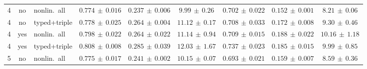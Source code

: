 \begin{table}[H]
{\begin{tabular}{ccl ccc ccc}
    \midrule
    4 & no  & nonlin.\ all     & $0.774{\scriptstyle\,\pm\,0.016}$ & $0.237{\scriptstyle\,\pm\,0.006}$ & $9.99{\scriptstyle\,\pm\,0.26}$ & $0.702{\scriptstyle\,\pm\,0.022}$ & $0.152{\scriptstyle\,\pm\,0.001}$ & $8.21{\scriptstyle\,\pm\,0.06}$ \\
    4 & no  & typed+triple     & $0.778{\scriptstyle\,\pm\,0.025}$ & $0.264{\scriptstyle\,\pm\,0.004}$ & $11.12{\scriptstyle\,\pm\,0.17}$ & $0.708{\scriptstyle\,\pm\,0.033}$ & $0.172{\scriptstyle\,\pm\,0.008}$ & $9.30{\scriptstyle\,\pm\,0.46}$ \\
    \addlinespace[2pt]
    4 & yes & nonlin.\ all     & $0.798{\scriptstyle\,\pm\,0.022}$ & $0.264{\scriptstyle\,\pm\,0.022}$ & $11.14{\scriptstyle\,\pm\,0.94}$ & $0.709{\scriptstyle\,\pm\,0.015}$ & $0.188{\scriptstyle\,\pm\,0.022}$ & $10.16{\scriptstyle\,\pm\,1.18}$ \\
    4 & yes & typed+triple     & $0.808{\scriptstyle\,\pm\,0.008}$ & $0.285{\scriptstyle\,\pm\,0.039}$ & $12.03{\scriptstyle\,\pm\,1.67}$ & $0.737{\scriptstyle\,\pm\,0.023}$ & $0.185{\scriptstyle\,\pm\,0.015}$ & $9.99{\scriptstyle\,\pm\,0.85}$ \\
    \midrule
    5 & no  & nonlin.\ all     & $0.775{\scriptstyle\,\pm\,0.017}$ & $0.241{\scriptstyle\,\pm\,0.002}$ & $10.15{\scriptstyle\,\pm\,0.07}$ & $0.693{\scriptstyle\,\pm\,0.021}$ & $0.159{\scriptstyle\,\pm\,0.007}$ & $8.59{\scriptstyle\,\pm\,0.36}$ \\

\end{tabular}}
\end{table}
